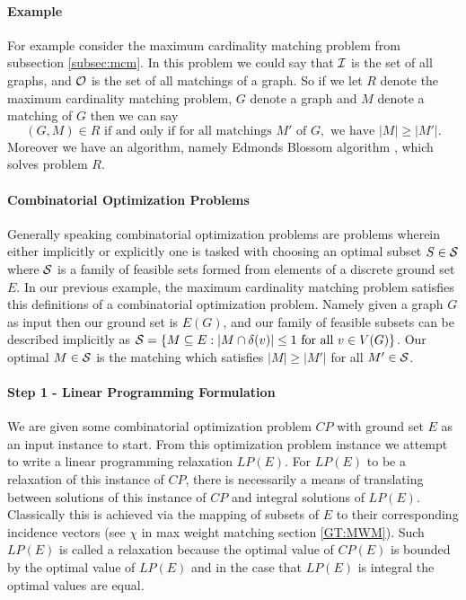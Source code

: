 \paragraph{Example}
For example consider the maximum cardinality matching problem from subsection \ref{subsec:mcm}. In this problem we could say that $\mathcal{I}$ is the set of all graphs, and $\mathcal{O}$ is the set of all matchings of a graph. So if we let $R$ denote the maximum cardinality matching problem, $G$ denote a graph and $M$ denote a matching of $G$ then we can say $$(G,M) \in R \text{ if and only if for all matchings } M'\text{ of } G, \text{ we have } |M| \geq |M'|.$$
Moreover we have an algorithm, namely Edmonds Blossom algorithm \cite{edmonds1965paths}, which solves problem $R$.
\paragraph{Combinatorial Optimization Problems}
Generally speaking combinatorial optimization problems are problems wherein either implicitly or explicitly one is tasked with choosing an optimal subset $S \in \mathcal{S}$ where $\mathcal{S}$ is a family of feasible sets formed from elements of a discrete ground set $E$. In our previous example, the maximum cardinality matching problem satisfies this definitions of a combinatorial optimization problem. Namely given a graph $G$ as input then our ground set is $E(G)$, and our family of feasible subsets can be described implicitly as $\mathcal{S} = \{M \subseteq E: |M \cap \delta(v)| \leq 1 \text{ for all } v\in V(G)\}$. Our optimal $M \in \mathcal{S}$ is the matching which satisfies $|M| \geq |M'|$ for all $M' \in \mathcal{S}$.
\paragraph{Step 1 - Linear Programming Formulation}
We are given some combinatorial optimization  problem $CP$ with ground set $E$ as an input instance to start. From this optimization problem instance we attempt to write a linear programming relaxation $LP(E)$. For $LP(E)$ to be a relaxation of this instance of $CP$, there is necessarily a means of translating between solutions of this instance of $CP$ and integral solutions of $LP(E)$. Classically this is achieved via the mapping of subsets of $E$ to their corresponding incidence vectors (see $\chi$ in max weight matching section \ref{GT:MWM}). Such $LP(E)$ is called a relaxation because the optimal value of $CP(E)$ is bounded by the optimal value of $LP(E)$ and in the case that $LP(E)$ is integral the optimal values are equal.
